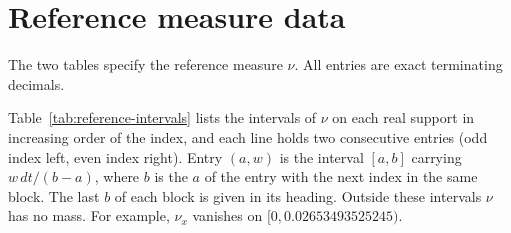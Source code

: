 \documentclass{amsart}
\numberwithin{equation}{section}
\numberwithin{table}{section}
\begin{document}
\section{Reference measure data}\label{app:reference-data}
The two tables specify the reference measure $\nu$. All entries are exact
terminating decimals.

Table~\ref{tab:reference-intervals} lists the intervals of $\nu$ on each real
support in increasing order of the index, and each line holds two consecutive
entries (odd index left, even index right). Entry $(a,w)$ is the interval
$[a,b]$ carrying $w\,dt/(b-a)$, where $b$ is the $a$ of the entry with the next
index in the same block. The last $b$ of each block is given in its heading.
Outside these intervals $\nu$ has no mass. For example, $\nu_x$ vanishes on
$[0,0.02653493525245)$.
\end{document}
